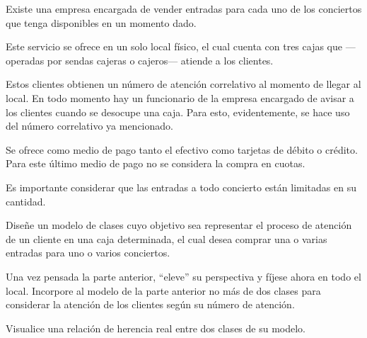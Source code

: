 \documentclass[11pt]{article}
\begin{document}
\begin{spacing}{1.2}
\thispagestyle{empty}
\evaluationTitle

\newcommand{\separatorLine}{\begin{center}\rule{.6\textwidth}{1pt}\end{center}}

\begin{Problem}


    Existe una empresa encargada de vender entradas para cada uno de los conciertos que
    tenga disponibles en un momento dado.

    Este servicio se ofrece en un solo local físico, el cual cuenta con tres cajas que ---operadas
    por sendas cajeras o cajeros--- atiende a los clientes.
    
    Estos clientes obtienen un número de atención correlativo al momento de llegar al local. En todo
    momento hay un funcionario de la empresa encargado de avisar a los clientes cuando se desocupe
    una caja. Para esto, evidentemente, se hace uso del número correlativo ya mencionado.

    Se ofrece como medio de pago tanto el efectivo como tarjetas de débito o crédito. Para este último
    medio de pago no se considera la compra en cuotas.

    Es importante considerar que las entradas a todo concierto están limitadas en su cantidad.

\begin{ProbPart}[difficulty={40}]

    Diseñe un modelo de clases cuyo objetivo sea representar el proceso de atención de
    un cliente en una caja determinada, el cual desea comprar
    una o varias entradas para uno o varios conciertos.

\end{ProbPart}
\begin{ProbPart}[difficulty={15}]

    Una vez pensada la parte anterior, ``eleve'' su perspectiva y fíjese ahora en todo el local.
    Incorpore al modelo de la parte anterior no más de dos clases para considerar la atención de los
    clientes según su número de atención.

\end{ProbPart}

\begin{ProbPart}[difficulty={5}]

    Visualice una relación de herencia real entre dos clases de su modelo.

\end{ProbPart}

\end{Problem}


\end{spacing}
\end{document}
